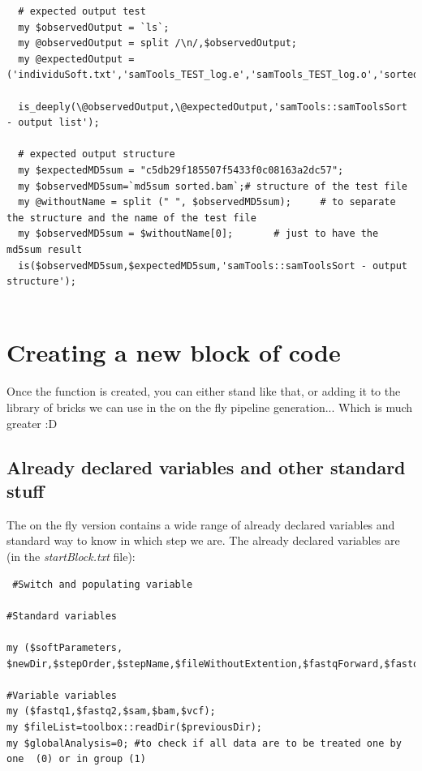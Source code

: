 \documentclass[a4paper,10pt]{report}
\begin{document}
\begin{lstlisting}
  # expected output test
  my $observedOutput = `ls`;
  my @observedOutput = split /\n/,$observedOutput;
  my @expectedOutput = ('individuSoft.txt','samTools_TEST_log.e','samTools_TEST_log.o','sorted.bam','unsorted.bam');

  is_deeply(\@observedOutput,\@expectedOutput,'samTools::samToolsSort - output list');

  # expected output structure
  my $expectedMD5sum = "c5db29f185507f5433f0c08163a2dc57";
  my $observedMD5sum=`md5sum sorted.bam`;# structure of the test file
  my @withoutName = split (" ", $observedMD5sum);     # to separate the structure and the name of the test file
  my $observedMD5sum = $withoutName[0];       # just to have the md5sum result
  is($observedMD5sum,$expectedMD5sum,'samTools::samToolsSort - output structure');
  
\end{lstlisting}



\chapter{Creating a new block of code}
Once the function is created, you can either stand like that, or adding it to the library of bricks we can use in the on the fly pipeline generation... Which is much greater :D

\section{Already declared variables and other standard stuff}

The on the fly version contains a wide range of already declared variables and standard way to know in which step we are. The already declared variables are (in the \emph{startBlock.txt} file):
\begin{lstlisting}
 #Switch and populating variable

#Standard variables

my ($softParameters, $newDir,$stepOrder,$stepName,$fileWithoutExtention,$fastqForward,$fastqReverse,$samFile,$extension,$samFileOut,$shortDirName,$stepF1,$vcfCalled,$vcfOut,$listOfBam,$bamFile,$bamFileOut,$cleanerCommand,$intervalsFile,$replacementCommand);

#Variable variables
my ($fastq1,$fastq2,$sam,$bam,$vcf);
my $fileList=toolbox::readDir($previousDir);
my $globalAnalysis=0; #to check if all data are to be treated one by one  (0) or in group (1)

\end{lstlisting}
\end{document}
